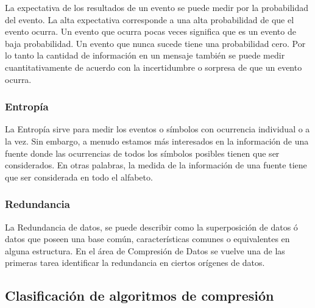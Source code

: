 La expectativa de los resultados de un evento se puede medir por la probabilidad del evento. La alta expectativa corresponde a una alta probabilidad de que el evento ocurra. Un evento que ocurra pocas veces significa que es un evento de baja probabilidad. Un evento que nunca sucede tiene una probabilidad cero. Por lo tanto la cantidad de información en un mensaje también se puede medir cuantitativamente de acuerdo con la incertidumbre o sorpresa de que un evento ocurra.





\subsubsection{Entropía}\label{ch2:concept-entropia}

La Entropía sirve para medir los eventos o símbolos con ocurrencia individual o a la vez. Sin embargo, a menudo estamos más interesados en la información de una fuente donde las ocurrencias de todos los símbolos posibles tienen que ser considerados. En otras palabras, la medida de la información de una fuente tiene que ser considerada en todo el alfabeto.





\subsubsection{Redundancia}\label{ch2:concept-redundacia}

La Redundancia de datos, se puede describir como la superposición de datos ó datos que poseen una base común, características comunes o equivalentes en alguna estructura. En el área de Compresión de Datos se vuelve una de las primeras tarea identificar la redundancia en ciertos orígenes de datos.


 






\uncm
\subsection{Clasificación de algoritmos de compresión}\label{sec-clas-alg-compreessdata} 

